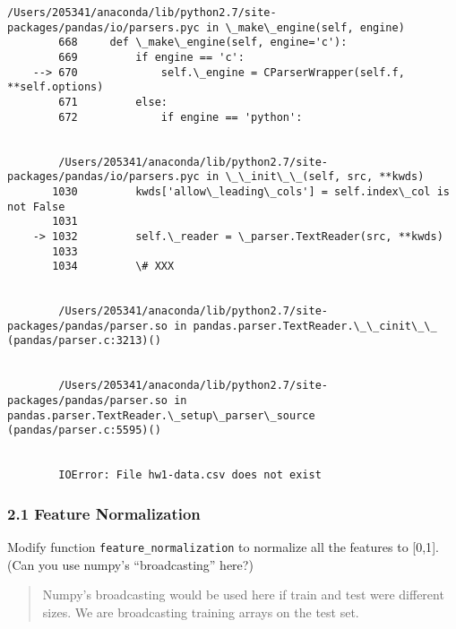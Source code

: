 \documentclass{article}
\begin{document}
\begin{Verbatim}[commandchars=\\\{\}]
        /Users/205341/anaconda/lib/python2.7/site-packages/pandas/io/parsers.pyc in \_make\_engine(self, engine)
        668     def \_make\_engine(self, engine='c'):
        669         if engine == 'c':
    --> 670             self.\_engine = CParserWrapper(self.f, **self.options)
        671         else:
        672             if engine == 'python':


        /Users/205341/anaconda/lib/python2.7/site-packages/pandas/io/parsers.pyc in \_\_init\_\_(self, src, **kwds)
       1030         kwds['allow\_leading\_cols'] = self.index\_col is not False
       1031 
    -> 1032         self.\_reader = \_parser.TextReader(src, **kwds)
       1033 
       1034         \# XXX


        /Users/205341/anaconda/lib/python2.7/site-packages/pandas/parser.so in pandas.parser.TextReader.\_\_cinit\_\_ (pandas/parser.c:3213)()


        /Users/205341/anaconda/lib/python2.7/site-packages/pandas/parser.so in pandas.parser.TextReader.\_setup\_parser\_source (pandas/parser.c:5595)()


        IOError: File hw1-data.csv does not exist

    \end{Verbatim}

    \subsubsection{2.1 Feature Normalization}\label{feature-normalization}

Modify function \texttt{feature\_normalization} to normalize all the
features to {[}0,1{]}. (Can you use numpy's ``broadcasting'' here?)

\begin{quote}
Numpy's broadcasting would be used here if train and test were different
sizes. We are broadcasting training arrays on the test set.
\end{quote}
\end{document}
